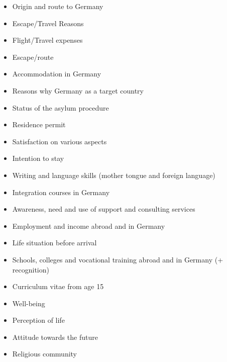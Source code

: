 \documentclass[letterpaper,10pt,openany,onesideH,english]{sphinxmanual}
\begin{document}
\begin{itemize}
\item {} 
Origin and route to Germany

\item {} 
Escape/Travel Reasons

\item {} 
Flight/Travel expenses

\item {} 
Escape/route

\item {} 
Accommodation in Germany

\item {} 
Reasons why Germany as a target country

\item {} 
Status of the asylum procedure

\item {} 
Residence permit

\item {} 
Satisfaction on various aspects

\item {} 
Intention to stay

\item {} 
Writing and language skills (mother tongue and foreign language)

\item {} 
Integration courses in Germany

\item {} 
Awareness, need and use of support and consulting services

\item {} 
Employment and income abroad and in Germany

\item {} 
Life situation before arrival

\item {} 
Schools, colleges and vocational training abroad and in Germany (+ recognition)

\item {} 
Curriculum vitae from age 15

\item {} 
Well-being

\item {} 
Perception of life

\item {} 
Attitude towards the future

\item {} 
Religious community


\end{itemize}
\end{document}
